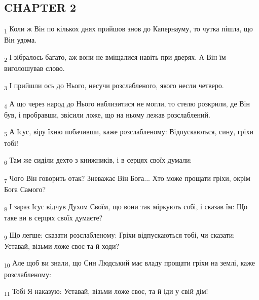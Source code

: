 \subsection{CHAPTER 2}
\begin{tcolorbox}
\textsubscript{1} Коли ж Він по кількох днях прийшов знов до Капернауму, то чутка пішла, що Він удома.
\end{tcolorbox}
\begin{tcolorbox}
\textsubscript{2} І зібралось багато, аж вони не вміщалися навіть при дверях. А Він їм виголошував слово.
\end{tcolorbox}
\begin{tcolorbox}
\textsubscript{3} І прийшли ось до Нього, несучи розслабленого, якого несли четверо.
\end{tcolorbox}
\begin{tcolorbox}
\textsubscript{4} А що через народ до Нього наблизитися не могли, то стелю розкрили, де Він був, і пробравши, звісили ложе, що на ньому лежав розслаблений.
\end{tcolorbox}
\begin{tcolorbox}
\textsubscript{5} А Ісус, віру їхню побачивши, каже розслабленому: Відпускаються, сину, гріхи тобі!
\end{tcolorbox}
\begin{tcolorbox}
\textsubscript{6} Там же сиділи дехто з книжників, і в серцях своїх думали:
\end{tcolorbox}
\begin{tcolorbox}
\textsubscript{7} Чого Він говорить отак? Зневажає Він Бога... Хто може прощати гріхи, окрім Бога Самого?
\end{tcolorbox}
\begin{tcolorbox}
\textsubscript{8} І зараз Ісус відчув Духом Своїм, що вони так міркують собі, і сказав їм: Що таке ви в серцях своїх думаєте?
\end{tcolorbox}
\begin{tcolorbox}
\textsubscript{9} Що легше: сказати розслабленому: Гріхи відпускаються тобі, чи сказати: Уставай, візьми ложе своє та й ходи?
\end{tcolorbox}
\begin{tcolorbox}
\textsubscript{10} Але щоб ви знали, що Син Людський має владу прощати гріхи на землі, каже розслабленому:
\end{tcolorbox}
\begin{tcolorbox}
\textsubscript{11} Тобі Я наказую: Уставай, візьми ложе своє, та й іди у свій дім!
\end{tcolorbox}
